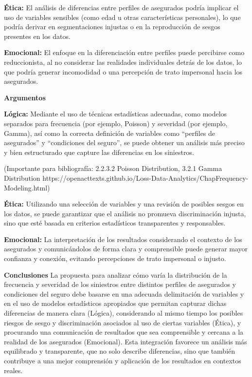 \documentclass[
  spanish,
  11pt,
  letterpaper,
]{article}
\begin{document}
\textbf{Ética:} El análisis de diferencias entre perfiles de asegurados
podría implicar el uso de variables sensibles (como edad u otras
características personales), lo que podría derivar en segmentaciones
injustas o en la reproducción de sesgos presentes en los datos.

\textbf{Emocional:} El enfoque en la diferenciación entre perfiles puede
percibirse como reduccionista, al no considerar las realidades
individuales detrás de los datos, lo que podría generar incomodidad o
una percepción de trato impersonal hacia los asegurados.

\textbf{Argumentos}

\textbf{Lógica:} Mediante el uso de técnicas estadísticas adecuadas,
como modelos separados para frecuencia (por ejemplo, Poisson) y
severidad (por ejemplo, Gamma), así como la correcta definición de
variables como ``perfiles de asegurados'' y ``condiciones del seguro'',
se puede obtener un análisis más preciso y bien estructurado que capture
las diferencias en los siniestros.

(Importante para bibliografía: 2.2.3.2 Poisson Distribution, 3.2.1 Gamma
Distribution
https://openacttexts.github.io/Loss-Data-Analytics/ChapFrequency-Modeling.html)

\textbf{Ética:} Utilizando una selección de variables y una revisión de
posibles sesgos en los datos, se puede garantizar que el análisis no
promueva discriminación injusta, sino que esté basada en criterios
estadísticos transparentes y responsables.

\textbf{Emocional:} La interpretación de los resultados considerando el
contexto de los asegurados y comunicándolos de forma clara y
comprensible puede generar mayor confianza y conexión, evitando
percepciones de trato impersonal o injusto.

\textbf{Conclusiones} La propuesta para analizar cómo varía la
distribución de la frecuencia y severidad de los siniestros entre
distintos perfiles de asegurados y condiciones del seguro debe basarse
en una adecuada delimitación de variables y en el uso de modelos
estadísticos apropiados que permitan capturar dichas diferencias de
manera clara (Lógica), considerando al mismo tiempo los posibles riesgos
de sesgo y discriminación asociados al uso de ciertas variables (Ética),
y procurando una comunicación de resultados que sea comprensible y
cercana a la realidad de los asegurados (Emocional). Esta integración
favorece un análisis más equilibrado y transparente, que no solo
describe diferencias, sino que también contribuye a una mejor
comprensión y aplicación de los resultados en contextos reales.
\end{document}
